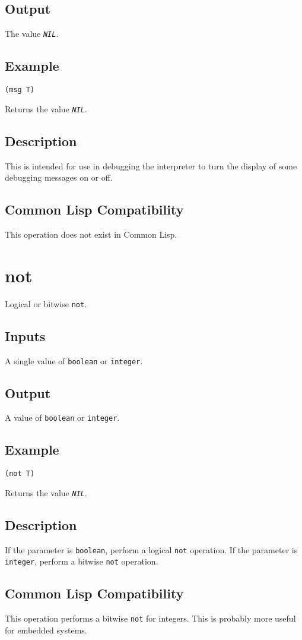 \documentclass[10pt, openany]{book}
\newcommand{\constant}[1]{\emph{\texttt{#1}}}
\newcommand{\keyword}[1]{\texttt{#1}}
\newcommand{\datatype}[1]{\texttt{#1}}
\newcommand{\cl}{Common Lisp}
\begin{document}
\subsection{Output}
The value \constant{NIL}.
\subsection{Example}
\begin{lstlisting}
(msg T)
\end{lstlisting}
Returns the value \constant{NIL}.
\subsection{Description}
This is intended for use in debugging the interpreter to turn the display of some debugging messages on or off.
\subsection{Common Lisp Compatibility}
This operation does not exist in \cl.

\section{not}
Logical or bitwise \keyword{not}.
\subsection{Inputs}
A single value of \datatype{boolean} or \datatype{integer}.
\subsection{Output}
A value of \datatype{boolean} or \datatype{integer}.
\subsection{Example}
\begin{lstlisting}
(not T)
\end{lstlisting}
Returns the value \constant{NIL}.
\subsection{Description}
If the parameter is \datatype{boolean}, perform a logical \keyword{not} operation.  If the parameter is \datatype{integer}, perform a bitwise \keyword{not} operation.
\subsection{Common Lisp Compatibility}
This operation performs a bitwise \keyword{not} for integers.  This is probably more useful for embedded systems.
\end{document}
